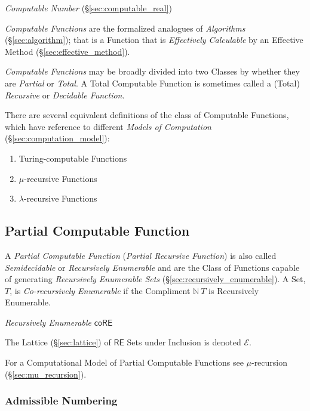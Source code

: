 \emph{Computable Number} (\S\ref{sec:computable_real})

\emph{Computable Functions} are the formalized analogues of
\emph{Algorithms} (\S\ref{sec:algorithm}); that is a Function that
is \emph{Effectively Calculable} by an Effective Method
(\S\ref{sec:effective_method}).

\emph{Computable Functions} may be broadly divided into two Classes by
whether they are \emph{Partial} or \emph{Total}. A Total Computable
Function is sometimes called a (Total) \emph{Recursive} or
\emph{Decidable Function}.

There are several equivalent definitions of the class of Computable
Functions, which have reference to different \emph{Models of
  Computation} (\S\ref{sec:computation_model}):
\begin{enumerate}
\item Turing-computable Functions
\item $\mu$-recursive Functions
\item $\lambda$-recursive Functions
\end{enumerate}



\subsection{Partial Computable Function}\label{sec:partial_computable}

A \emph{Partial Computable Function} (\emph{Partial Recursive
  Function}) is also called \emph{Semidecidable} or \emph{Recursively
  Enumerable} and are the Class of Functions capable of generating
\emph{Recursively Enumerable Sets}
(\S\ref{sec:recursively_enumerable}). A Set, $T$, is
\emph{Co-recursively Enumerable} if the Compliment $\mathbb{N} \ T$ is
Recursively Enumerable.

\emph{Recursively Enumerable} $\mathsf{coRE}$

The Lattice (\S\ref{sec:lattice}) of $\mathsf{RE}$ Sets under
Inclusion is denoted $\mathcal{E}$.

For a Computational Model of Partial Computable Functions see
$\mu$-recursion (\S\ref{sec:mu_recursion}).



\subsubsection{Admissible Numbering}\label{sec:admissible_numbering}

